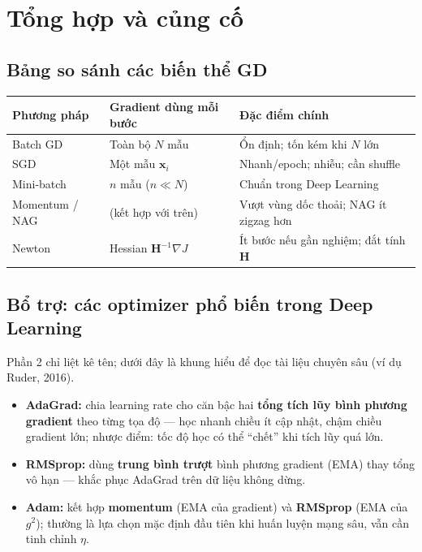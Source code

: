 \section*{Tổng hợp và củng cố}

\subsection{Bảng so sánh các biến thể GD}

\begin{tinhchat}[title={Phân loại theo dữ liệu và cập nhật}]
\begin{center}
\small
\begin{tabular}{@{}lll@{}}
\toprule
\textbf{Phương pháp} & \textbf{Gradient dùng mỗi bước} & \textbf{Đặc điểm chính} \\
\midrule
Batch GD & Toàn bộ $N$ mẫu & Ổn định; tốn kém khi $N$ lớn \\
SGD & Một mẫu $\mathbf{x}_i$ & Nhanh/epoch; nhiễu; cần shuffle \\
Mini-batch & $n$ mẫu ($n \ll N$) & Chuẩn trong Deep Learning \\
Momentum / NAG & (kết hợp với trên) & Vượt vùng dốc thoải; NAG ít zigzag hơn \\
Newton & Hessian $\mathbf{H}^{-1}\nabla J$ & Ít bước nếu gần nghiệm; đắt tính $\mathbf{H}$ \\
\bottomrule
\end{tabular}
\end{center}
\end{tinhchat}

\subsection{Bổ trợ: các optimizer phổ biến trong Deep Learning}

\begin{ynghia}[title={AdaGrad, RMSprop, Adam --- ý tưởng ngắn gọn}]
Phần 2 chỉ liệt kê tên; dưới đây là khung hiểu để đọc tài liệu chuyên sâu (ví dụ Ruder, 2016).
\begin{itemize}
  \item \textbf{AdaGrad:} chia learning rate cho căn bậc hai \textbf{tổng tích lũy bình phương gradient} theo từng tọa độ --- học nhanh chiều ít cập nhật, chậm chiều gradient lớn; nhược điểm: tốc độ học có thể ``chết'' khi tích lũy quá lớn.
  \item \textbf{RMSprop:} dùng \textbf{trung bình trượt} bình phương gradient (EMA) thay tổng vô hạn --- khắc phục AdaGrad trên dữ liệu không dừng.
  \item \textbf{Adam:} kết hợp \textbf{momentum} (EMA của gradient) và \textbf{RMSprop} (EMA của $g^2$); thường là lựa chọn mặc định đầu tiên khi huấn luyện mạng sâu, vẫn cần tinh chỉnh $\eta$.
\end{itemize}
\end{ynghia}

